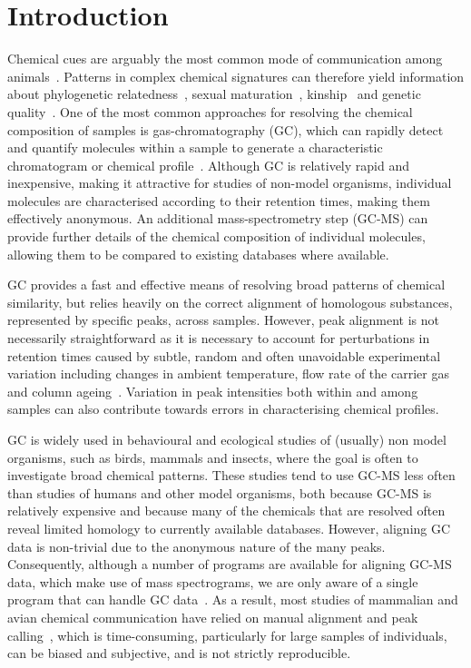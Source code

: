 \documentclass[10pt,letterpaper]{article}
\begin{document}
\section*{Introduction}
Chemical cues are arguably the most common mode of communication among animals~\cite{Wyatt.2014}. Patterns in complex chemical signatures can therefore yield information about phylogenetic relatedness~\cite{Meulemeester.2011}, sexual maturation~\cite{Caspers.2011}, kinship~\cite{Bonadonna.2012, Krause.2012, Stoffel.2015} and genetic quality~\cite{Charpentier.2010, Leclaire.2012, Stoffel.2015}. One of the most common approaches for resolving the chemical composition of samples is gas-chromatography (GC), which can rapidly detect and quantify molecules within a sample to generate a characteristic chromatogram or chemical profile~\cite{McNair.2011}. Although GC is relatively rapid and inexpensive, making it attractive for studies of non-model organisms, individual molecules are characterised according to their retention times, making them effectively anonymous.  An additional mass-spectrometry step (GC-MS) can provide further details of the chemical composition of individual molecules, allowing them to be compared to existing databases where available.\par
GC provides a fast and effective means of resolving broad patterns of chemical similarity, but relies heavily on the correct alignment of homologous substances, represented by specific peaks, across samples.  However, peak alignment is not necessarily straightforward as it is necessary to account for perturbations in retention times caused by subtle, random and often unavoidable experimental variation including changes in ambient temperature, flow rate of the carrier gas and column ageing~\cite{Scott.2003, Pierce.2005}.  Variation in peak intensities both within and among samples can also contribute towards errors in characterising chemical profiles. \par
GC is widely used in behavioural and ecological studies of (usually) non model organisms, such as birds, mammals and insects, where the goal is often to investigate broad chemical patterns.  These studies tend to use GC-MS less often than studies of humans and other model organisms, both because GC-MS is relatively expensive and because many of the chemicals that are resolved often reveal limited homology to currently available databases. However, aligning GC data is non-trivial due to the anonymous nature of the many peaks. Consequently, although a number of programs are available for aligning GC-MS data, which make use of mass spectrograms, we are only aware of a single program that can handle GC data~\cite{Dellicour.2013}.  As a result, most studies of mammalian and avian chemical communication have relied on manual alignment and peak calling~\cite{Drea.2013}, which is time-consuming, particularly for large samples of individuals, can be biased and subjective, and is not strictly reproducible. \par
\end{document}
